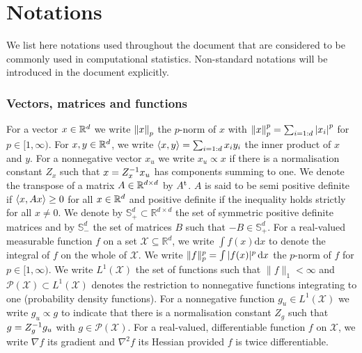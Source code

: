 
\chapter*{Notations}

We list here notations used throughout the document that are considered to be commonly used in computational statistics. Non-standard notations will be introduced in the document explicitly.

\subsection*{Vectors, matrices and functions} 
For a vector $x\in\mathbb R^{d}$ we write $\left\|x\right\|_{p}$ the $p$-norm of $x$ with $\left\|x\right\|_{p}^{p}=\sum_{i=1:d}\left|x_{i}\right|^{p}$ for $p\in[1,\infty)$. 
For $x,y\in\mathbb R^{d}$, we write $\left\langle x,y \right\rangle=\sum_{i=1:d}x_{i}y_{i}$ the inner product of $x$ and $y$. For a nonnegative vector $x_u$ we write $x_u\propto x$ if there is a normalisation constant $Z_x$ such that $x=Z_x^{-1} x_u$ has components summing to one.
We denote the transpose of a matrix $A\in\mathbb R^{d\times d}$ by $A^\mathrm{t}$. $A$ is said to be semi positive definite if $\left\langle x,Ax \right\rangle\ge 0$ for all $x\in\mathbb R^{d}$ and positive definite if the inequality holds strictly for all $x\neq 0$. We denote by $\mathbb S_+^{d}\subset \mathbb R^{d\times d}$ the set of symmetric positive definite matrices and by $\mathbb S_-^{d}$ the set of matrices $B$ such that $-B\in\mathbb S_+^{d}$.
For a real-valued measurable function $f$ on a set $\mathcal X\subseteq \mathbb R^{d}$, we write $\int f(x)\mathrm d{x}$ to denote the integral of $f$ on the whole of $\mathcal X$. We write $\|f\|_{p}^{p}=\int |f(x)|^{p}\,\mathrm{d} x$ the $p$-norm of $f$ for $p\in[1,\infty)$. 
We write $L^{1}(\mathcal X)$ the set of functions such that $\|f\|_{1}<\infty$ and $\mathcal P(\mathcal X) \subset L^{1}(\mathcal X)$ denotes the restriction to nonnegative functions integrating to one (probability density functions). For a nonnegative function $g_u\in  L^{1}(\mathcal X)$ we write $g_u\propto g$ to indicate that there is a normalisation constant $Z_g$ such that $g=Z_g^{-1} g_u$ with $g\in\mathcal P(\mathcal X)$.  
For a real-valued, differentiable function $f$ on $\mathcal X$, we write $\nabla f$ its gradient and $\nabla^{2} f$ its Hessian provided $f$ is twice differentiable. 
%

